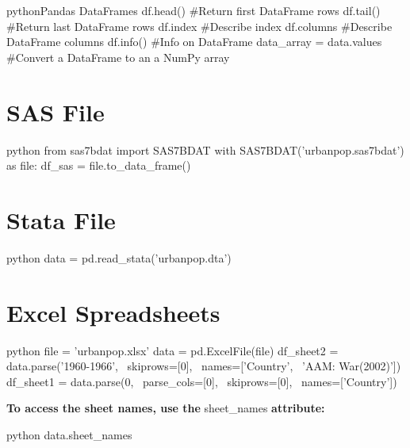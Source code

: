 \begin{codebox}{python}{Pandas DataFrames}
df.head()  #Return first DataFrame rows
df.tail()  #Return last DataFrame rows
df.index  #Describe index
df.columns  #Describe DataFrame columns
df.info()  #Info on DataFrame
data_array = data.values  #Convert a DataFrame to an a NumPy array
\end{codebox}

\section{SAS File}

\begin{codebox}{python}{}
from sas7bdat import SAS7BDAT
with SAS7BDAT('urbanpop.sas7bdat') as file:
    df_sas = file.to_data_frame()
\end{codebox}


\section{Stata File}

\begin{codebox}{python}{}
data = pd.read_stata('urbanpop.dta')
\end{codebox}


\section{Excel Spreadsheets}

\begin{myblock}{}
\begin{codebox}{python}{}
file = 'urbanpop.xlsx'
data = pd.ExcelFile(file)
df_sheet2 = data.parse('1960-1966', \
                    skiprows=[0], \
                    names=['Country', \
                    'AAM: War(2002)'])
df_sheet1 = data.parse(0, \
                    parse_cols=[0], \
                    skiprows=[0], \
                    names=['Country'])
\end{codebox}
\textbf{To access the sheet names{,} use the }sheet\_names \textbf{ attribute:}
\begin{codebox}{python}{}
data.sheet_names
\end{codebox}
\end{myblock}

